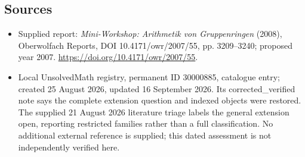 \documentclass[11pt]{article}
\begin{document}
\subsection{Sources}
\begin{itemize}
\item Supplied report: \emph{Mini-Workshop: Arithmetik von Gruppenringen} (2008), Oberwolfach Reports, DOI 10.4171/owr/2007/55, pp. 3209--3240; proposed year 2007. \url{https://doi.org/10.4171/owr/2007/55}.
\item Local UnsolvedMath registry, permanent ID 30000885, catalogue entry; created 25 August 2026, updated 16 September 2026. Its corrected\_verified note says the complete extension question and indexed objects were restored. The supplied 21 August 2026 literature triage labels the general extension open, reporting restricted families rather than a full classification. No additional external reference is supplied; this dated assessment is not independently verified here.
\end{itemize}
\end{document}
